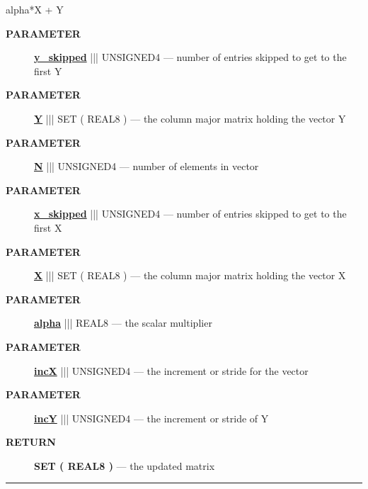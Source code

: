 \par





alpha*X + Y






\par
\begin{description}
\item [\colorbox{tagtype}{\color{white} \textbf{\textsf{PARAMETER}}}] \textbf{\underline{y\_skipped}} ||| UNSIGNED4 --- number of entries skipped to get to the first Y
\item [\colorbox{tagtype}{\color{white} \textbf{\textsf{PARAMETER}}}] \textbf{\underline{Y}} ||| SET ( REAL8 ) --- the column major matrix holding the vector Y
\item [\colorbox{tagtype}{\color{white} \textbf{\textsf{PARAMETER}}}] \textbf{\underline{N}} ||| UNSIGNED4 --- number of elements in vector
\item [\colorbox{tagtype}{\color{white} \textbf{\textsf{PARAMETER}}}] \textbf{\underline{x\_skipped}} ||| UNSIGNED4 --- number of entries skipped to get to the first X
\item [\colorbox{tagtype}{\color{white} \textbf{\textsf{PARAMETER}}}] \textbf{\underline{X}} ||| SET ( REAL8 ) --- the column major matrix holding the vector X
\item [\colorbox{tagtype}{\color{white} \textbf{\textsf{PARAMETER}}}] \textbf{\underline{alpha}} ||| REAL8 --- the scalar multiplier
\item [\colorbox{tagtype}{\color{white} \textbf{\textsf{PARAMETER}}}] \textbf{\underline{incX}} ||| UNSIGNED4 --- the increment or stride for the vector
\item [\colorbox{tagtype}{\color{white} \textbf{\textsf{PARAMETER}}}] \textbf{\underline{incY}} ||| UNSIGNED4 --- the increment or stride of Y
\end{description}







\par
\begin{description}
\item [\colorbox{tagtype}{\color{white} \textbf{\textsf{RETURN}}}] \textbf{SET ( REAL8 )} --- the updated matrix
\end{description}




\rule{\linewidth}{0.5pt}
